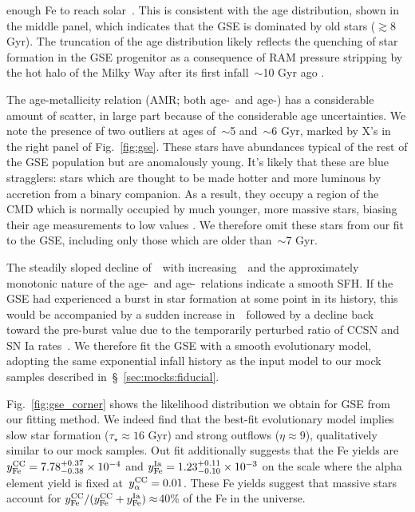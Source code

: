 \documentclass[ms.tex]{subfiles}
\begin{document}
enough Fe to reach solar~\afe.
This is consistent with the age distribution, shown in the middle panel,
which indicates that the GSE is dominated by old stars ($\gtrsim$8 Gyr).
The truncation of the age distribution likely reflects the quenching of star
formation in the GSE progenitor as a consequence of RAM pressure stripping by
the hot halo of the Milky Way after its first infall~$\sim$10 Gyr ago
\citep{Bonaca2020}.
\par
The age-metallicity relation (AMR; both age-\feh~and age-\afe) has a
considerable amount of scatter, in large part because of the considerable age
uncertainties.
We note the presence of two outliers at ages of~$\sim$5 and~$\sim$6 Gyr, marked
by X's in the right panel of Fig.~\ref{fig:gse}.
These stars have abundances typical of the rest of the GSE population but are
anomalously young.
It's likely that these are blue stragglers: stars which are thought to be made
hotter and more luminous by accretion from a binary companion.
As a result, they occupy a region of the CMD which is normally occupied by much
younger, more massive stars, biasing their age measurements to low values
\citep[e.g.][]{Bond1971, Stryker1993}.
We therefore omit these stars from our fit to the GSE, including only those
which are older than~$\sim$7 Gyr.
\par
The steadily sloped decline of~\afe~with increasing~\feh~and the approximately
monotonic nature of the age-\feh~and age-\afe~relations indicate a smooth
SFH.
If the GSE had experienced a burst in star formation at some point in its
history, this would be accompanied by a sudden increase in~\afe~followed by
a decline back toward the pre-burst value due to the temporarily perturbed
ratio of CCSN and SN Ia rates~\citep{Johnson2020}.
We therefore fit the GSE with a smooth evolutionary model, adopting the same
exponential infall history as the input model to our mock samples described
in~\S~\ref{sec:mocks:fiducial}.
\par
Fig.~\ref{fig:gse_corner} shows the likelihood distribution we obtain for GSE
from our fitting method.
We indeed find that the best-fit evolutionary model implies slow star formation
($\tau_\star \approx 16$ Gyr) and strong outflows ($\eta \approx 9$),
qualitatively similar to our mock samples.
Out fit additionally suggests that the Fe yields are
$y_\text{Fe}^\text{CC} = 7.78^{+0.37}_{-0.38}\times10^{-4}$ and
$y_\text{Fe}^\text{Ia} = 1.23^{+0.11}_{-0.10}\times10^{-3}$ on the scale where the alpha
element yield is fixed at~$y_\alpha^\text{CC} = 0.01$.
These Fe yields suggest that massive stars account for
$y_\text{Fe}^\text{CC} / (y_\text{Fe}^\text{CC} + y_\text{Fe}^\text{Ia}) \approx $40\% of the Fe in the universe.
\end{document}
